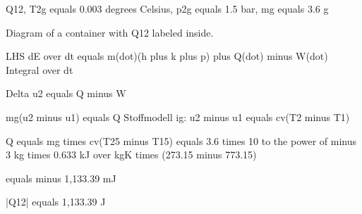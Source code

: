 Q12, T2g equals 0.003 degrees Celsius, p2g equals 1.5 bar, mg equals 3.6 g  

Diagram of a container with Q12 labeled inside.  

LHS  
dE over dt equals m(dot)(h plus k plus p) plus Q(dot) minus W(dot)  
Integral over dt  

Delta u2 equals Q minus W  

mg(u2 minus u1) equals Q  
Stoffmodell ig: u2 minus u1 equals cv(T2 minus T1)  

Q equals mg times cv(T25 minus T15) equals 3.6 times 10 to the power of minus 3 kg times 0.633 kJ over kgK times (273.15 minus 773.15)  

equals minus 1,133.39 mJ  

|Q12| equals 1,133.39 J